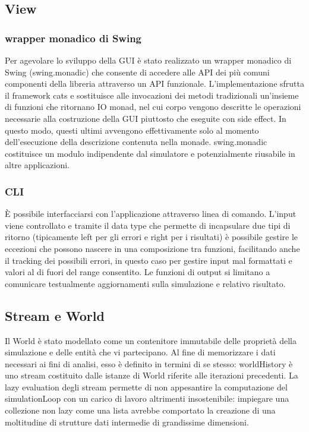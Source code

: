\subsection{View}

\subsubsection{wrapper monadico di Swing}
Per agevolare lo sviluppo della GUI è stato realizzato un wrapper monadico di Swing (swing.monadic) che consente di accedere alle API dei più comuni componenti della libreria attraverso un API funzionale. L’implementazione sfrutta il framework cats e sostituisce alle invocazioni dei metodi tradizionali un’insieme di funzioni che ritornano IO monad, nel cui corpo vengono descritte le operazioni necessarie alla costruzione della GUI piuttosto che eseguite con side effect. In questo modo, questi ultimi avvengono effettivamente solo al momento dell’esecuzione della descrizione contenuta nella monade. swing.monadic costituisce un modulo indipendente dal simulatore e potenzialmente riusabile in altre applicazioni.

\subsubsection{CLI}
È possibile interfacciarsi con l'applicazione attraverso linea di comando. L'input viene controllato e tramite il data type  che permette di incapsulare due tipi di ritorno (tipicamente left per gli errori e right per i risultati) è possibile gestire le eccezioni che possono nascere in una composizione tra funzioni, facilitando anche il tracking dei possibili errori, in questo caso per gestire input mal formattati e valori al di fuori del range consentito. Le funzioni di output si limitano a comunicare testualmente aggiornamenti sulla simulazione e relativo risultato.

\subsection{Stream e World}
Il World è stato modellato come un contenitore immutabile delle proprietà della simulazione e delle entità che vi partecipano. Al fine di memorizzare i dati necessari ai fini di analisi, esso è definito in termini di se stesso: worldHistory è uno stream costituito dalle istanze di World riferite alle iterazioni precedenti. La lazy evaluation degli stream permette di non appesantire la computazione del simulationLoop con un carico di lavoro altrimenti insostenibile: impiegare una collezione non lazy come una lista avrebbe comportato la creazione di una moltitudine di strutture dati intermedie di grandissime dimensioni. 

